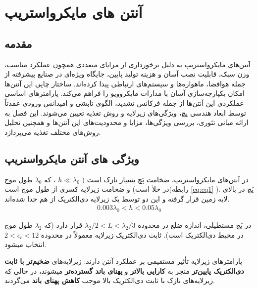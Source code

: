\clearpage
\chapter{ آنتن های مایکرواستریپ}
\label{ch:1}

\section{مقدمه}
آنتن‌های مایکرواستریپ به دلیل برخورداری از مزایای متعددی همچون عملکرد مناسب، وزن سبک، قابلیت نصب آسان و هزینه تولید پایین، جایگاه ویژه‌ای در صنایع پیشرفته از جمله هوافضا، ماهواره‌ها و سیستم‌های ارتباطی پیدا کرده‌اند. ساختار چاپی این آنتن‌ها امکان یکپارچه‌سازی آسان با مدارات مایکروویو را فراهم می‌کند. پارامترهای اساسی عملکردی این آنتن‌ها از جمله فرکانس تشدید، الگوی تابشی و امپدانس ورودی عمدتاً توسط ابعاد هندسی پچ، ویژگی‌های زیرلایه و روش تغذیه تعیین می‌شوند. این فصل به ارائه مبانی تئوری، بررسی ویژگی‌ها، مزایا و محدودیت‌های این آنتن‌ها و همچنین تحلیل روش‌های مختلف تغذیه می‌پردازد.
\section{ویژگی های آنتن مایکرواستریپ}


در آنتن‌های مایکرواستریپ، ضخامت پَچ
 بسیار نازک است (
$ h \ll \lambda_{0}$
، که 
$ \lambda_{0} $
 طول موج در خلأ است) و ضخامت زیرلایه
  کسری از طول موج است(رابطه 
 \eqref{eq:eq1}
 ). پَچ در بالای لایه زمین قرار گرفته و این دو توسط یک زیرلایه دی‌الکتریک از هم جدا شده‌اند. 
\begin{align}
	\label{eq:eq1}
	0.003\lambda_{0} < h < 0.05\lambda_{0}
\end{align}

در پَچ مستطیلی، اندازه ضلع
  در محدوده
$ \lambda_{2}/2 < L < \lambda_{2}/3$
    قرار دارد (که
$ \lambda_{2} $
      طول موج در محیط دی‌الکتریک است). ثابت دی‌الکتریک زیرلایه معمولاً در محدوده
$ 2 < \epsilon_r < 12$
        انتخاب میشود. 

پارامترهای زیرلایه تأثیر مستقیمی بر عملکرد آنتن دارند: زیرلایه‌های
\textbf{
 ضخیم‌تر با ثابت دی‌الکتریک پایین‌تر
}
  منجر به
\textbf{
کارایی بالاتر
} 
و
\textbf{
پهنای باند گسترده‌تر
}
میشوند، در حالی که زیرلایه‌های نازک با ثابت دی‌الکتریک بالا موجب
\textbf{
کاهش پهنای باند
}
می‌گردند.


